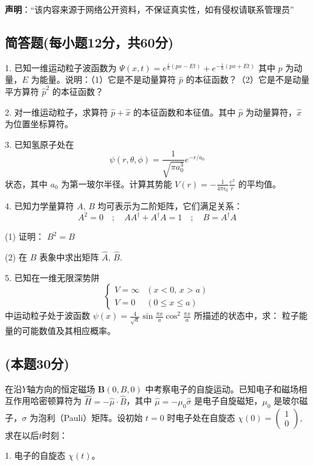 
\textbf{声明}：“该内容来源于网络公开资料，不保证真实性，如有侵权请联系管理员”

\subsection{简答题(每小题12分，共60分)}
1. 已知一维运动粒子波函数为
$ \Psi(x, t) = e^{\frac{i}{\hbar}(px - Et)} + e^{-\frac{i}{\hbar}(px + Et)}$ 
其中 $p$ 为动量，$E$ 为能量。说明：（1）它是不是动量算符 $\hat{p}$ 的本征函数？（2）它是不是动量平方算符 $\hat{p}^2$ 的本征函数？

2. 对一维运动粒子，求算符 $\hat{p} +\hat{x}$ 的本征函数和本征值。其中 $\hat{p}$ 为动量算符，$\hat{x}$ 为位置坐标算符。

3. 已知氢原子处在
$$ \psi(r, \theta, \phi) = \frac{1}{\sqrt{\pi a_0^3}} e^{-r/a_0}~$$ 
状态，其中 $a_0$ 为第一玻尔半径。计算其势能 $V(r) = -\frac{1}{4\pi \epsilon_0} \frac{e^2}{r}$ 的平均值。

4. 已知力学量算符 $A, \, B$ 均可表示为二阶矩阵，它们满足关系：
$$A^2 = 0 \quad ; \quad AA^{\dagger} + A^{\dagger}A = 1 \quad ; \quad B = A^{\dagger}A~$$

(1) 证明： $B^2 = B$

(2) 在 $B$ 表象中求出矩阵 $\hat{A}, \, \hat{B}$.

5. 已知在一维无限深势阱
$$
\begin{cases}
V = \infty & (x < 0, \, x > a) \\
V = 0 & (0 \leq x \leq a)
\end{cases}~
$$
中运动粒子处于波函数 $\psi(x) = \frac{4}{\sqrt{a}} \sin{\frac{\pi x}{a}} \cos^2{\frac{\pi x}{a}}$ 所描述的状态中，求：
粒子能量的可能数值及其相应概率。

\subsection{(本题30分)}
在沿$Y$轴方向的恒定磁场 $\mathbf{B}(0, B, 0)$ 中考察电子的自旋运动。已知电子和磁场相互作用哈密顿算符为 $\hat H = -\hat{\mu} \cdot \hat{B}$，其中 $\hat{\mu} = -\mu_{0} \hat{\sigma}$ 是电子自旋磁矩，$\mu_0$ 是玻尔磁子，$\hat{\sigma}$ 为泡利（Pauli）矩阵。设初始 $t=0$ 时电子处在自旋态
$ \chi(0) = \begin{pmatrix} 1 \\ 0 \end{pmatrix},$
求在以后$t$时刻：

1. 电子的自旋态 $\chi(t)$。

